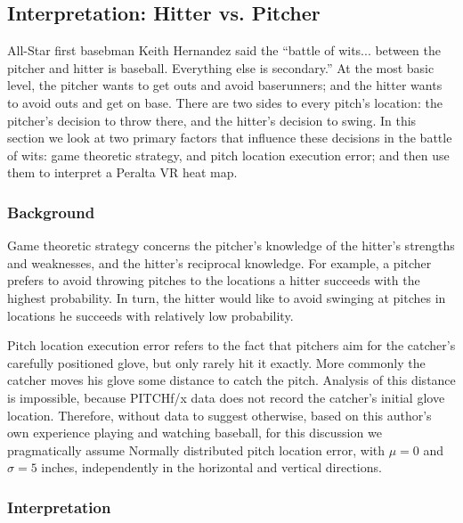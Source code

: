 \subsection{Interpretation: Hitter vs. Pitcher} %

All-Star first basebman Keith Hernandez said the ``battle of wits... between the pitcher and hitter is baseball. Everything else is secondary.'' At the most basic level, the pitcher wants to get outs and avoid baserunners; and the hitter wants to avoid outs and get on base. There are two sides to every pitch's location: the pitcher's decision to throw there, and the hitter's decision to swing. In this section we look at two primary factors that influence these decisions in the battle of wits: game theoretic strategy, and pitch location execution error; and then use them to interpret a Peralta VR heat map.

\subsubsection*{Background}

Game theoretic strategy concerns the pitcher's knowledge of the hitter's strengths and weaknesses, and the hitter's reciprocal knowledge. For example, a pitcher prefers to avoid throwing pitches to the locations a hitter succeeds with the highest probability. In turn, the hitter would like to avoid swinging at pitches in locations he succeeds with relatively low probability.

Pitch location execution error refers to the fact that pitchers aim for the catcher's carefully positioned glove, but only rarely hit it exactly. More commonly the catcher moves his glove some distance to catch the pitch.  Analysis of this distance is impossible, because PITCHf/x\textsuperscript{\textregistered} data does not record the catcher's initial glove location. Therefore, without data to suggest otherwise, based on this author's own experience playing and watching baseball, for this discussion we pragmatically assume Normally distributed pitch location error, with $\mu = 0$ and $\sigma = 5$ inches, independently in the horizontal and vertical directions. 
\subsubsection*{Interpretation}

